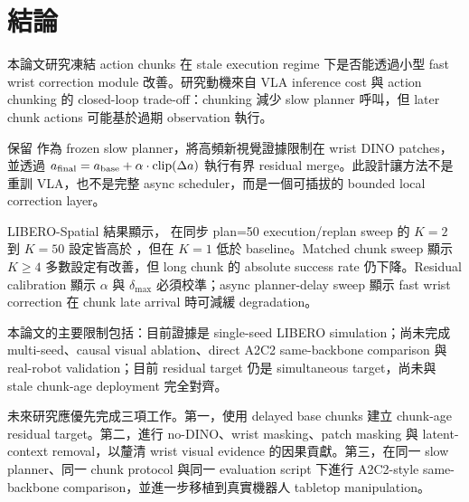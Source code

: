 \chapter{結論}
\label{ch:conclusion}

本論文研究凍結 \smolvla{} action chunks 在 stale execution regime 下是否能透過小型 fast wrist correction module 改善。研究動機來自 VLA inference cost 與 action chunking 的 closed-loop trade-off：chunking 減少 slow planner 呼叫，但 later chunk actions 可能基於過期 observation 執行。

\method{} 保留 \smolvla{} 作為 frozen slow planner，將高頻新視覺證據限制在 wrist DINO patches，並透過 $a_{\mathrm{final}}=a_{\mathrm{base}}+\alpha\cdot\mathrm{clip}(\Delta a)$ 執行有界 residual merge。此設計讓方法不是重訓 VLA，也不是完整 async scheduler，而是一個可插拔的 bounded local correction layer。

LIBERO-Spatial 結果顯示，\method{} 在同步 plan=50 execution/replan sweep 的 $K=2$ 到 $K=50$ 設定皆高於 \smolvla{}，但在 $K=1$ 低於 baseline。Matched chunk sweep 顯示 $K\geq4$ 多數設定有改善，但 long chunk 的 absolute success rate 仍下降。Residual calibration 顯示 $\alpha$ 與 $\delta_{\max}$ 必須校準；async planner-delay sweep 顯示 fast wrist correction 在 chunk late arrival 時可減緩 degradation。

本論文的主要限制包括：目前證據是 single-seed LIBERO simulation；尚未完成 multi-seed、causal visual ablation、direct A2C2 same-backbone comparison 與 real-robot validation；目前 residual target 仍是 simultaneous target，尚未與 stale chunk-age deployment 完全對齊。

未來研究應優先完成三項工作。第一，使用 delayed base chunks 建立 chunk-age residual target。第二，進行 no-DINO、wrist masking、patch masking 與 latent-context removal，以釐清 wrist visual evidence 的因果貢獻。第三，在同一 slow planner、同一 chunk protocol 與同一 evaluation script 下進行 A2C2-style same-backbone comparison，並進一步移植到真實機器人 tabletop manipulation。

